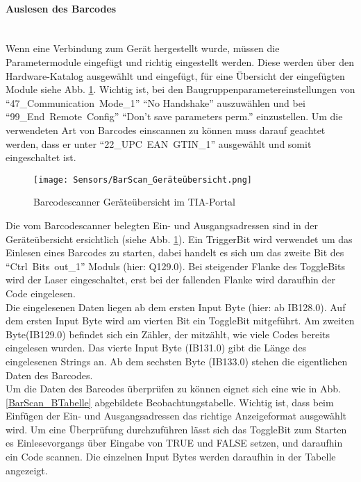\paragraph{Auslesen des Barcodes}\mbox{}\\
Wenn eine Verbindung zum Gerät hergestellt wurde, müssen die Parametermodule eingefügt und richtig eingestellt werden. Diese werden über den Hardware-Katalog ausgewählt und eingefügt, für eine Übersicht der eingefügten Module siehe Abb. \ref{BarScan_TIA}. Wichtig ist, bei den Baugruppenparametereinstellungen von \enquote{\mbox{47\_Communication Mode\_1}} \enquote{No Handshake} auszuwählen und bei \enquote{\mbox{99\_End Remote Config}}
\enquote{Don't save parameters perm.} einzustellen. Um die verwendeten Art von Barcodes einscannen zu können muss darauf geachtet werden, dass er unter \enquote{\mbox{22\_UPC EAN GTIN\_1}} ausgewählt und somit eingeschaltet ist.\\

\begin{figure}[H]
    \centering
    \texttt{[image: Sensors/BarScan\_Geräteübersicht.png]}
    \caption{Barcodescanner Geräteübersicht im TIA-Portal}
    \label{BarScan_TIA}
\end{figure}

Die vom Barcodescanner belegten Ein- und Ausgangsadressen sind in der Geräteübersicht ersichtlich (siehe Abb. \ref{BarScan_TIA}). Ein TriggerBit wird verwendet um das Einlesen eines Barcodes zu starten, dabei handelt es sich um das zweite Bit des \enquote{\mbox{Ctrl Bits out\_1}} Moduls (hier: Q129.0). Bei steigender Flanke des ToggleBits wird der Laser eingeschaltet, erst bei der fallenden Flanke wird daraufhin der Code eingelesen.\\
Die eingelesenen Daten liegen ab dem ersten Input Byte (hier: ab IB128.0). Auf dem ersten Input Byte wird am vierten Bit ein ToggleBit mitgeführt. Am zweiten Byte(IB129.0) befindet sich ein Zähler, der mitzählt, wie viele Codes bereits eingelesen wurden. Das vierte Input Byte (IB131.0) gibt die Länge des eingelesenen Strings an. Ab dem sechsten Byte (IB133.0) stehen die eigentlichen Daten des Barcodes.\\
Um die Daten des Barcodes überprüfen zu können eignet sich eine wie in Abb. \ref{BarScan_BTabelle} abgebildete Beobachtungstabelle. Wichtig ist, dass beim Einfügen der Ein- und Ausgangsadressen das richtige Anzeigeformat ausgewählt wird. Um eine Überprüfung durchzuführen lässt sich das ToggleBit zum Starten es Einlesevorgangs über Eingabe von TRUE und FALSE setzen, und daraufhin ein Code scannen. Die einzelnen Input Bytes werden daraufhin in der Tabelle angezeigt.


